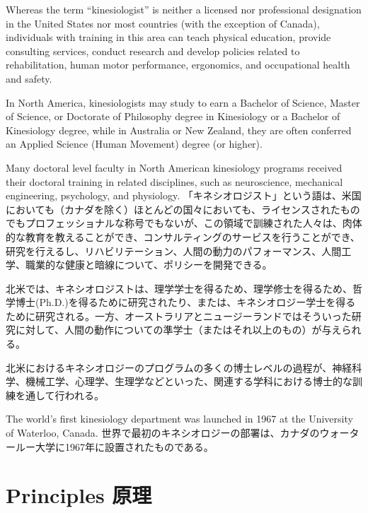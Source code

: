 \documentclass[uplatex,dvipdfmx]{jsarticle} \usepackage{amsmath,amssymb,bm}
\begin{document}
\begin{paracol}{2}
Whereas the term ``kinesiologist'' is neither a licensed nor professional designation in the United States nor most countries (with the exception of Canada), individuals with training in this area can teach physical education, provide consulting services, conduct research and develop policies related to rehabilitation, human motor performance, ergonomics, and occupational health and safety.

In North America, kinesiologists may study to earn a Bachelor of Science, Master of Science, or Doctorate of Philosophy degree in Kinesiology or a Bachelor of Kinesiology degree, while in Australia or New Zealand, they are often conferred an Applied Science (Human Movement) degree (or higher).

Many doctoral level faculty in North American kinesiology programs received their doctoral training in related disciplines, such as neuroscience, mechanical engineering, psychology, and physiology.
\switchcolumn
「キネシオロジスト」という語は、米国においても（カナダを除く）ほとんどの国々においても、ライセンスされたものでもプロフェッショナルな称号でもないが、この領域で訓練された人々は、肉体的な教育を教えることができ、コンサルティングのサービスを行うことができ、研究を行えるし、リハビリテーション、人間の動力のパフォーマンス、人間工学、職業的な健康と暗線について、ポリシーを開発できる。

北米では、キネシオロジストは、理学学士を得るため、理学修士を得るため、哲学博士(Ph.D.)を得るために研究されたり、または、キネシオロジー学士を得るために研究される。一方、オーストラリアとニュージーランドではそういった研究に対して、人間の動作についての準学士（またはそれ以上のもの）が与えられる。

北米におけるキネシオロジーのプログラムの多くの博士レベルの過程が、神経科学、機械工学、心理学、生理学などといった、関連する学科における博士的な訓練を通して行われる。
\end{paracol}
\vspace{\baselineskip}
\begin{paracol}{2}
The world's first kinesiology department was launched in 1967 at the University of Waterloo, Canada.
\switchcolumn
世界で最初のキネシオロジーの部署は、カナダのウォータールー大学に1967年に設置されたものである。
\end{paracol}
\section*{Principles 原理}
\end{document}
